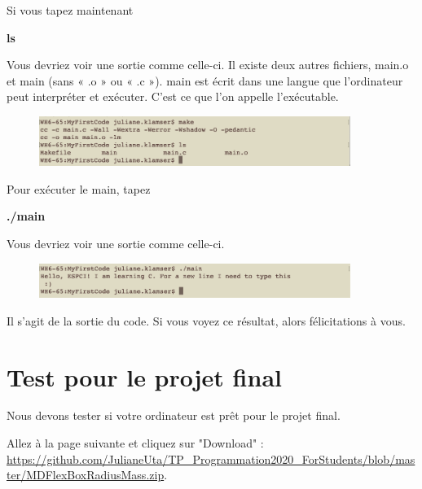 \documentclass{article}
\begin{document}
Si vous tapez maintenant 
\begin{tcolorbox}[width=\textwidth,colframe=Bittersweet,colback={black},title={Ceci est le terminal},outer arc=0mm,colupper=white]   
      \large\textbf{ ls}
\end{tcolorbox}
Vous devriez voir une sortie comme celle-ci. Il existe deux autres fichiers, main.o et main (sans « .o » ou « .c »). main est écrit dans une langue que l'ordinateur peut interpréter et exécuter. C'est ce que l'on appelle l'exécutable.
 \begin{figure}[H]
\center
\includegraphics[width=0.9\textwidth]{Plots/FirstCode_7.png}
\end{figure}
Pour exécuter le main, tapez
\begin{tcolorbox}[width=\textwidth,colframe=Bittersweet,colback={black},title={Ceci est le terminal},outer arc=0mm,colupper=white]   
      \large\textbf{ ./main}
\end{tcolorbox}
Vous devriez voir une sortie comme celle-ci. 
\begin{figure}[H]
\center
\includegraphics[width=0.9\textwidth]{Plots/FirstCode_8.png}
\end{figure}
Il s'agit de la sortie du code. Si vous voyez ce résultat, alors félicitations à vous. 

\section{Test pour le projet final}
Nous devons tester si votre ordinateur est prêt pour le projet final.

Allez à la page suivante et cliquez sur "Download" : \\ \href{https://github.com/JulianeUta/TP_Programmation2020_ForStudents/blob/master/MDFlexBoxRadiusMass.zip}{https://github.com/JulianeUta/TP\_Programmation2020\_ForStudents/blob/master/MDFlexBoxRadiusMass.zip}.
\end{document}
